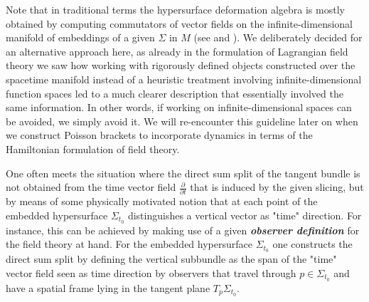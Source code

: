 \begin{remark}
Note that in traditional terms the hypersurface deformation algebra is mostly obtained by computing commutators of vector fields on the infinite-dimensional manifold of embeddings of a given $\Sigma$ in $M$ (see \cite{HOJMAN197688} and \cite{doi:10.1063/1.522976}). We deliberately decided for an alternative approach here, as already in the formulation of Lagrangian field theory we saw how working with rigorously defined objects constructed over the spacetime manifold instead of a heuristic treatment involving infinite-dimensional function spaces led to a much clearer description that essentially involved the same information. In other words, if working on infinite-dimensional spaces can be avoided, we simply avoid it. We will re-encounter this guideline later on when we construct Poisson brackets to incorporate dynamics in terms of the Hamiltonian formulation of field theory.
\end{remark}

One often meets the situation where the direct sum split of the tangent bundle is not obtained from the time vector field $\frac{\partial}{\partial t}$ that is induced by the given slicing, but by means of some physically motivated notion that at each point of the embedded hypersurface $\Sigma_{t_0}$ distinguishes a vertical vector as "time" direction. For instance, this can be achieved by making use of a given \textit{\textbf{observer definition}} for the field theory at hand. For the embedded hypersurface $\Sigma_{t_0}$ one constructs the direct sum split by defining the vertical subbundle as the span of the "time" vector field seen as time direction by observers that travel through $p \in \Sigma_{t_0}$ and have a spatial frame lying in the tangent plane $T_p\Sigma_{t_0}$.

